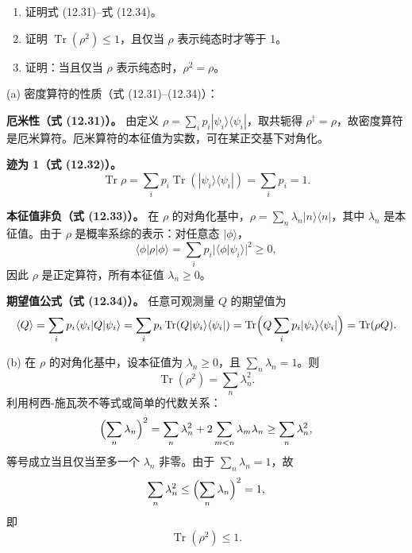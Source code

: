 \begin{question}
\begin{enumerate}
\item 证明式 (12.31)--式 (12.34)。
\item 证明 $\operatorname{Tr}(\rho^2)\le 1$，且仅当 $\rho$ 表示纯态时才等于 1。
\item 证明：当且仅当 $\rho$ 表示纯态时，$\rho^2=\rho$。
\end{enumerate}

\par\smallskip
{}

\end{question}
\begin{solution}
(a) 密度算符的性质（式 (12.31)--(12.34)）：

\textbf{厄米性（式 (12.31)）。} 由定义 $\rho = \sum_i p_i |\psi_i\rangle\langle\psi_i|$，取共轭得 $\rho^\dagger = \rho$，故密度算符是厄米算符。厄米算符的本征值为实数，可在某正交基下对角化。

\textbf{迹为 1（式 (12.32)）。}
\[
\operatorname{Tr}\rho = \sum_i p_i \operatorname{Tr}(|\psi_i\rangle\langle\psi_i|) = \sum_i p_i = 1.
\]

\textbf{本征值非负（式 (12.33)）。} 在 $\rho$ 的对角化基中，$\rho = \sum_n \lambda_n |n\rangle\langle n|$，其中 $\lambda_n$ 是本征值。由于 $\rho$ 是概率系综的表示：对任意态 $|\phi\rangle$，
\[
\langle\phi|\rho|\phi\rangle = \sum_i p_i |\langle\phi|\psi_i\rangle|^2 \ge 0,
\]
因此 $\rho$ 是正定算符，所有本征值 $\lambda_n \ge 0$。

\textbf{期望值公式（式 (12.34)）。} 任意可观测量 $Q$ 的期望值为
\[
\langle Q\rangle = \sum_i p_i \langle\psi_i|Q|\psi_i\rangle
= \sum_i p_i \operatorname{Tr}(Q|\psi_i\rangle\langle\psi_i|)
= \operatorname{Tr}\Bigl(Q\sum_i p_i|\psi_i\rangle\langle\psi_i|\Bigr)
= \operatorname{Tr}(\rho Q).
\]

(b) 在 $\rho$ 的对角化基中，设本征值为 $\lambda_n \ge 0$，且 $\sum_n \lambda_n = 1$。则
\[
\operatorname{Tr}(\rho^2) = \sum_n \lambda_n^2.
\]
利用柯西-施瓦茨不等式或简单的代数关系：
\[
\Bigl(\sum_n \lambda_n\Bigr)^2 = \sum_n \lambda_n^2 + 2\sum_{m<n} \lambda_m\lambda_n \ge \sum_n \lambda_n^2,
\]
等号成立当且仅当至多一个 $\lambda_n$ 非零。由于 $\sum_n \lambda_n = 1$，故
\[
\sum_n \lambda_n^2 \le \Bigl(\sum_n \lambda_n\Bigr)^2 = 1,
\]
即
\[
\boxed{\operatorname{Tr}(\rho^2) \le 1.}
\]


\end{solution}
